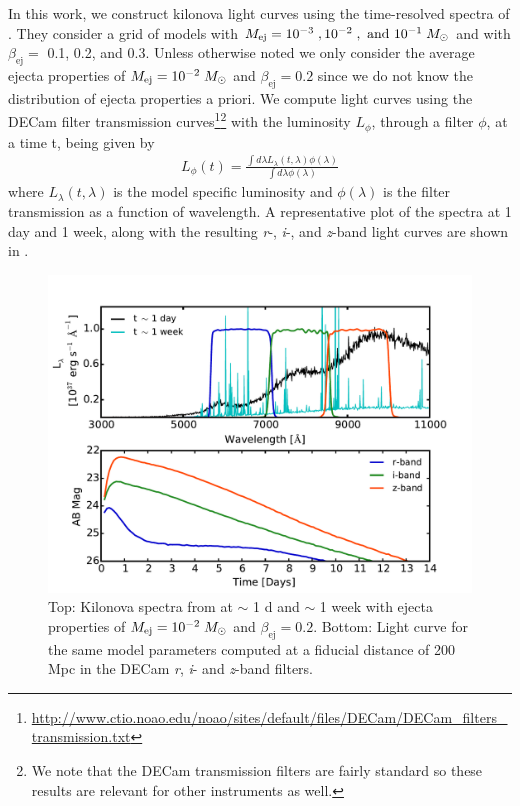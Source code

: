 In this work, we construct kilonova light curves using the time-resolved spectra of \citet{BarnesKasen13}. They consider a grid of models with $M_{\rm ej} = 10^{-3}\;, 10^{-2} \;, \text{ and } 10^{-1} \;M_{\odot}$ and with $\beta_{\text{ej}} = $ 0.1, 0.2, and 0.3. Unless otherwise noted we only consider the average ejecta properties of $M_{\rm ej} =10^{-2}\;M_{\odot}$ and $\beta_{\text{ej}} = 0.2$ since we do not know the distribution of ejecta properties a priori. We compute light curves using the DECam filter transmission curves\footnote{\url{http://www.ctio.noao.edu/noao/sites/default/files/DECam/DECam_filters_transmission.txt}}\footnote{We note that the DECam transmission filters are fairly standard so these results are relevant for other instruments as well.} with the luminosity $L_{\phi}$, through a filter $\phi$, at a time t, being given by
\begin{align}
\label{eq:LCint}
L_{\phi}(t) = \frac{\int d\lambda L_{\lambda}(t,\lambda) \phi(\lambda)}{\int d\lambda \phi(\lambda)}
\end{align}
\noindent where $L_{\lambda}(t,\lambda)$ is the model specific luminosity and $\phi(\lambda)$ is the filter transmission as a function of wavelength. A representative plot of the spectra at 1 day and 1 week, along with the resulting {\em r}-, {\em i}-, and {\em z}-band light curves are shown in .

\begin{figure}[t!]
\centering
\includegraphics[width=\textwidth]{./figs/chapter2/ch2_f1.pdf}
\caption{Top: Kilonova spectra from \citet{BarnesKasen13} at $\sim$ 1 d and $\sim$ 1 week with ejecta properties of $M_{\rm ej} =10^{-2}\;M_{\odot}$ and $\beta_{\text{ej}} = 0.2$. Bottom: Light curve for the same model parameters computed at a fiducial distance of 200 Mpc in the DECam {\em r}, {\em i}- and {\em z}-band filters. \vspace{10pt}}
\label{fig:ch2_kilosample}
\end{figure}

